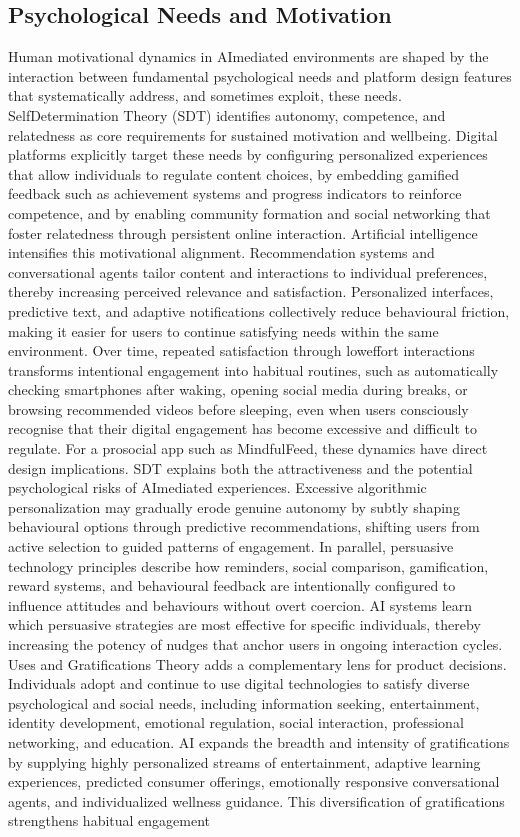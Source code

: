 \documentclass{article}
\begin{document}
\subsection{Psychological Needs and Motivation}
\label{sec:psych_needs_motivation} Human motivational dynamics in AI\-mediated environments are shaped by the interaction between fundamental psychological needs and platform design features that systematically address, and sometimes exploit, these needs. Self\-Determination Theory (SDT) identifies autonomy, competence, and relatedness as core requirements for sustained motivation and well\-being. Digital platforms explicitly target these needs by configuring personalized experiences that allow individuals to regulate content choices, by embedding gamified feedback such as achievement systems and progress indicators to reinforce competence, and by enabling community formation and social networking that foster relatedness through persistent online interaction. Artificial intelligence intensifies this motivational alignment. Recommendation systems and conversational agents tailor content and interactions to individual preferences, thereby increasing perceived relevance and satisfaction. Personalized interfaces, predictive text, and adaptive notifications collectively reduce behavioural friction, making it easier for users to continue satisfying needs within the same environment. Over time, repeated satisfaction through low\-effort interactions transforms intentional engagement into habitual routines, such as automatically checking smartphones after waking, opening social media during breaks, or browsing recommended videos before sleeping, even when users consciously recognise that their digital engagement has become excessive and difficult to regulate. For a pro\-social app such as MindfulFeed, these dynamics have direct design implications. SDT explains both the attractiveness and the potential psychological risks of AI\-mediated experiences. Excessive algorithmic personalization may gradually erode genuine autonomy by subtly shaping behavioural options through predictive recommendations, shifting users from active selection to guided patterns of engagement. In parallel, persuasive technology principles describe how reminders, social comparison, gamification, reward systems, and behavioural feedback are intentionally configured to influence attitudes and behaviours without overt coercion. AI systems learn which persuasive strategies are most effective for specific individuals, thereby increasing the potency of nudges that anchor users in ongoing interaction cycles. Uses and Gratifications Theory adds a complementary lens for product decisions. Individuals adopt and continue to use digital technologies to satisfy diverse psychological and social needs, including information seeking, entertainment, identity development, emotional regulation, social interaction, professional networking, and education. AI expands the breadth and intensity of gratifications by supplying highly personalized streams of entertainment, adaptive learning experiences, predicted consumer offerings, emotionally responsive conversational agents, and individualized wellness guidance. This diversification of gratifications strengthens habitual engagement 
\end{document}
